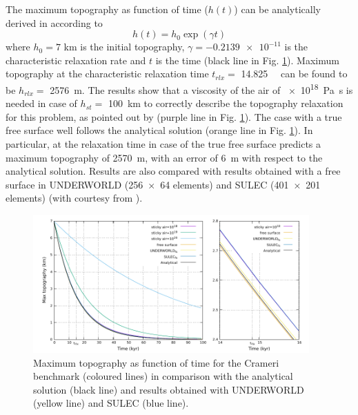 \documentclass[hidelinks,10pt,a4paper]{article}
\begin{document}
The maximum topography as function of time ($h(t)$) can be analytically derived in according to \[h(t)=h_0 \exp(\gamma t)\]
where $h_0=7$ km is the initial topography, $\gamma=\num{-0.2139e-11}$ is the characteristic relaxation rate and $t$ is the time (black line in Fig.
\ref{fig:crameri}). Maximum topography at the characteristic relaxation time $t_{rlx}=$ \SI{14.825}{\kilo\year} can be found to be $h_{rlx}=$ \SI{2576}{\m}.
The results show that a viscosity of the air of \SI{e18}{\pascal\s} is needed in case of $h_{st}=$ \SI{100}{\km} to correctly describe the topography relaxation
for this problem, as pointed out by \citet{Crameri2012} (purple line in Fig. \ref{fig:crameri}). The case with a true free surface well follows the analytical
solution (orange line in Fig. \ref{fig:crameri}). In particular, at the relaxation time in case of the true free surface predicts a maximum topography of
\SI{2570}{\m}, with an error of \SI{6}{\m} with respect to the analytical solution. Results are also compared with results obtained with a free surface in
UNDERWORLD (\num{256x64} elements) and SULEC (\num{401x201} elements) (with courtesy from \citealp{Crameri2012}).

\begin{figure}
\centering
\noindent\includegraphics[width=400px]{./Figures/Crameri.pdf}
\caption{Maximum topography as function of time for the Crameri benchmark (coloured lines) in comparison with the analytical solution (black line) and results
obtained with UNDERWORLD (yellow line) and SULEC (blue line).}
\label{fig:crameri}
\end{figure}
\end{document}
